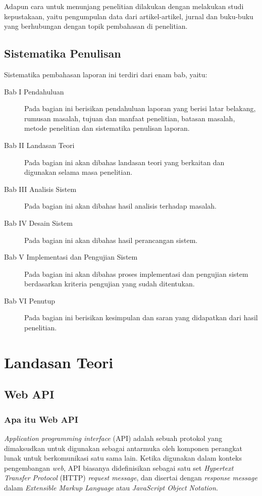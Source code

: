\documentclass[a4paper, 12pt]{report}
\begin{document}
\onehalfspacing Adapun cara untuk menunjang penelitian dilakukan dengan melakukan studi kepustakaan, yaitu pengumpulan data dari artikel-artikel, jurnal dan buku-buku yang berhubungan dengan topik pembahasan di penelitian.

\section{Sistematika Penulisan}
Sistematika pembahasan laporan ini terdiri dari enam bab, yaitu:
\begin{description}
  \item[Bab I Pendahuluan] Pada bagian ini berisikan pendahuluan laporan yang berisi latar belakang, rumusan masalah, tujuan dan manfaat penelitian, batasan masalah, metode penelitian dan sistematika penulisan laporan.
  \item[Bab II Landasan Teori] Pada bagian ini akan dibahas landasan teori yang berkaitan dan digunakan selama masa penelitian.
  \item[Bab III Analisis Sistem] Pada bagian ini akan dibahas hasil analisis terhadap masalah.
  \item[Bab IV Desain Sistem] Pada bagian ini akan dibahas hasil perancangan sistem.
  \item[Bab V Implementasi dan Pengujian Sistem] Pada bagian ini akan dibahas proses implementasi dan pengujian sistem berdasarkan kriteria pengujian yang sudah ditentukan.
  \item[Bab VI Penutup] Pada bagian ini berisikan kesimpulan dan saran yang didapatkan dari hasil penelitian.
\end{description}

\chapter{Landasan Teori}

\section{Web API}
\onehalfspacing
\subsection{Apa itu Web API}

\onehalfspacing \textit{Application programming interface} (API) adalah sebuah protokol yang dimaksudkan untuk digunakan sebagai antarmuka oleh komponen perangkat lunak untuk berkomunikasi satu sama lain. Ketika digunakan dalam konteks pengembangan \textit{web}, API biasanya didefinisikan sebagai satu set \textit{Hypertext Transfer Protocol} (HTTP) \textit{request message}, dan disertai dengan \textit{response message} dalam \textit{Extensible Markup Language} atau \textit{JavaScript Object Notation}.
\end{document}
